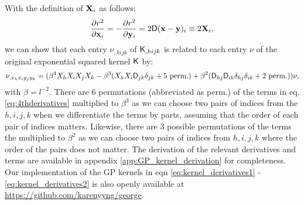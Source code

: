 With the definition of ${\bf X}_i$ as follows:
\begin{equation}
	\frac{\partial r^2}{\partial \mathbf{x}_i} = -\frac{\partial
	r^2}{\partial \mathbf{y}_i} =
	2 \mathsf{D}(\mathbf{x} - \mathbf{y})_i \equiv 2{\bf X}_i,
\end{equation}
we can show that each entry $\nu_{,hijk}$ of $\mathsf{K}_{,hijk}$ is
related to each entry $\nu$ of the original exponential squared kernel
$\mathsf{K}$ by:
\begin{equation}
\nu_{,x_h x_i y_j y_k} = (\beta^4 X_h X_i X_j X_k -
\beta^3 (X_h X_i \mathsf{D}_{jk} \delta_{jk} + 5~{\rm perm.}) + \beta^2
(\mathsf{D}_{hj} \mathsf{D}_{ik}\delta_{hj}\delta_{ik} + 2~{\rm perm.})) \nu,
\label{eq:4thderivatives}
\end{equation}
with $\beta = l^{-2}$. There are 6 permutations (abbreviated as perm.) of the terms in
eq. \ref{eq:4thderivatives}
multiplied to $\beta^3$ as we can choose two pairs of indices from the $h,i,j,k$ 
when we differentiate the terms by parts, assuming that the order of each
pair of indices matters. 
Likewise, there are 3 possible permutations of
the terms the multiplied to $\beta^2$ as we can choose two pairs of indices from
$h, i, j, k$ where the order of the pairs does not matter.
The derivation of the relevant derivatives and terms are available 
in appendix \ref{app:GP_kernel_derivation} for completeness. 
Our implementation of the GP kernels in eqn \ref{eq:kernel_derivatives1} - 
\ref{eq:kernel_derivatives2} is also openly available at
\href{https://github.com/karenyyng/george}{https://github.com/karenyyng/george}.

